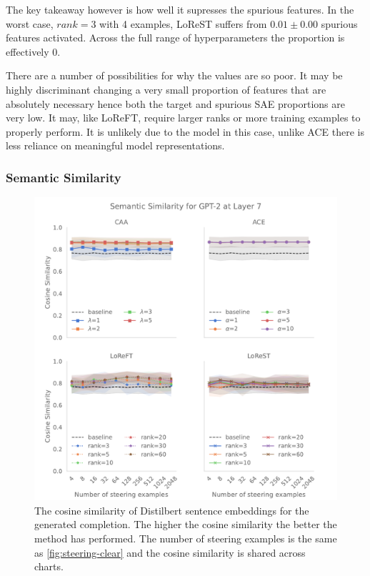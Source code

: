 The key takeaway however is how well it supresses the spurious features.
In the worst case, $rank = 3$ with 4 examples, LoReST suffers from $0.01 \pm 0.00$ spurious features activated.
Across the full range of hyperparameters the proportion is effectively $0$.

There are a number of possibilities for why the values are so poor.
It may be highly discriminant changing a very small proportion of features that are absolutely necessary hence both the target and spurious SAE proportions are very low.
It may, like LoReFT, require larger ranks or more training examples to properly perform.
It is unlikely due to the model in this case, unlike ACE there is less reliance on meaningful model representations.

\subsubsection{Semantic Similarity}

\begin{figure}
    \centering
    \captionsetup{width=.9\textwidth}
    \includegraphics[width=\textwidth]{figures/gpt2_7_similarity.pdf}
    \caption{
        The cosine similarity of Distilbert \citep{distilbert} sentence embeddings for the generated completion.
        The higher the cosine similarity the better the method has performed.
        The number of steering examples is the same as \cref{fig:steering-clear} and the cosine similarity is shared across charts.
    }
    \label{fig:gpt-pp-sim} \end{figure}

